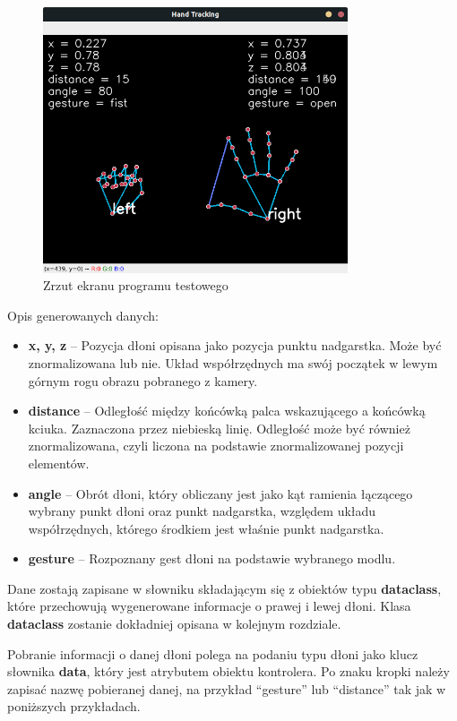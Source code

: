 \begin{figure}[H]
    \begin{center}
        \includegraphics[width=9cm]{../images/example_program.png}
        \caption{Zrzut ekranu programu testowego}
        \label{fig:prog_screen_1}
    \end{center}
\end{figure}


Opis generowanych danych:

\begin{itemize}
    \item \textbf{x, y, z} -- Pozycja dłoni opisana jako pozycja punktu nadgarstka. Może być znormalizowana lub nie. Układ współrzędnych ma swój początek w lewym górnym rogu obrazu pobranego z kamery. 
    \item \textbf{distance} -- Odległość między końcówką palca wskazującego a końcówką kciuka. Zaznaczona przez niebieską linię. Odległość może być również znormalizowana, czyli liczona na podstawie znormalizowanej pozycji elementów. 
    \item \textbf{angle} -- Obrót dłoni, który obliczany jest jako kąt ramienia łączącego wybrany punkt dłoni oraz punkt nadgarstka, względem układu współrzędnych, którego środkiem jest właśnie punkt nadgarstka.
    \item \textbf{gesture} -- Rozpoznany gest dłoni na podstawie wybranego modlu.\newline
\end{itemize}

\quad Dane zostają zapisane w słowniku składającym się z obiektów typu \textbf{dataclass}, które przechowują wygenerowane informacje o prawej i lewej dłoni. Klasa \textbf{dataclass} zostanie dokładniej opisana w kolejnym rozdziale.

\newpage
\quad Pobranie informacji o danej dłoni polega na podaniu typu dłoni jako klucz słownika \textbf{data}, który jest atrybutem obiektu kontrolera. Po znaku kropki należy zapisać nazwę pobieranej danej, na przykład \enquote{gesture} lub \enquote{distance} tak jak w poniższych przykładach.\newline

